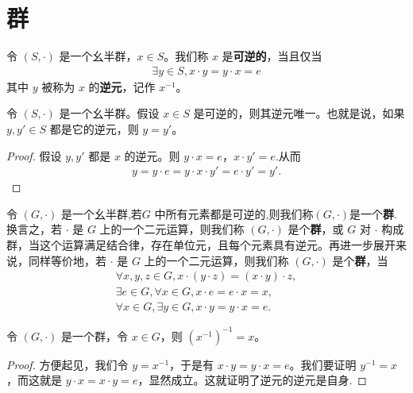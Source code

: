\documentclass[../../main.tex]{subfiles}
\begin{document}
\section{群}

\begin{definition}
令 $(S, \cdot)$ 是一个幺半群，$x \in S$。我们称 $x$ 是\textbf{可逆的}，当且仅当
\begin{align*}
\exists y \in S, x \cdot y = y \cdot x = e
\end{align*}
其中 $y$ 被称为 $x$ 的\textbf{逆元}，记作 $x^{-1}$。 
\end{definition}

\begin{proposition}[逆元存在必唯一]
令 $(S, \cdot)$ 是一个幺半群。假设 $x \in S$ 是可逆的，则其逆元唯一。也就是说，如果 $y, y' \in S$ 都是它的逆元，则 $y = y'$。
\end{proposition}
\begin{proof}
假设 $y, y'$ 都是 $x$ 的逆元。则 $y \cdot x = e$，$x \cdot y' = e$.从而
\begin{align*}
y = y \cdot e = y \cdot x \cdot y' = e \cdot y' = y' .
\end{align*}
\end{proof}

\begin{definition}[群]
令 $(G, \cdot)$ 是一个幺半群,若$G$ 中所有元素都是可逆的,则我们称$(G,\cdot)$是一个\textbf{群}.换言之，若 $\cdot$ 是 $G$ 上的一个二元运算，则我们称 $(G, \cdot)$ 是个\textbf{群}，或 $G$ 对 $\cdot$ 构成群，当这个运算满足结合律，存在单位元，且每个元素具有逆元。再进一步展开来说，同样等价地，若 $\cdot$ 是 $G$ 上的一个二元运算，则我们称 $(G, \cdot)$ 是个\textbf{群}，当
\begin{gather*}
\forall x, y, z \in G, x \cdot (y \cdot z) = (x \cdot y) \cdot z ,\\
\exists e \in G, \forall x \in G, x \cdot e = e \cdot x = x ,\\
\forall x \in G, \exists y \in G, x \cdot y = y \cdot x = e .
\end{gather*} 
\end{definition}

\begin{proposition}\label{proposition:群中元素取两次逆元还是其自身}
令 $(G, \cdot)$ 是一个群，令 $x \in G$，则 $(x^{-1})^{-1} = x$。
\end{proposition}
\begin{proof}
方便起见，我们令 $y = x^{-1}$，于是有 $x \cdot y = y \cdot x = e$。我们要证明 $y^{-1} = x$，而这就是 $y \cdot x = x \cdot y = e$，显然成立。这就证明了逆元的逆元是自身.
\end{proof}
\end{document}
